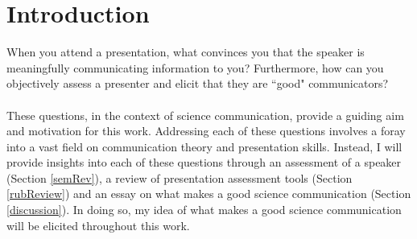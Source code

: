 \section{Introduction}

When you attend a presentation, what convinces you that the speaker is meaningfully communicating
information to you?
Furthermore, how can you objectively assess a presenter and elicit that they are ``good"
communicators?\\
\\
These questions, in the context of science communication, provide a guiding aim and motivation for
this work.
Addressing each of these questions involves a foray into a vast field on
communication theory and presentation skills.
Instead, I will provide insights into each of these questions through an assessment of a speaker
(Section \ref{semRev}), a review of presentation assessment tools (Section \ref{rubReview}) and an
essay on what makes a good science communication (Section \ref{discussion}).
In doing so, my idea of what makes a good science communication will be elicited throughout this
work.
